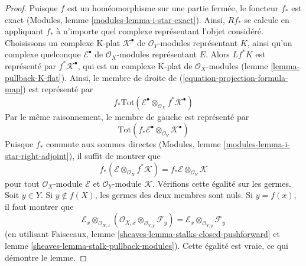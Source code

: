{\begin{proof}
Puisque $f$ est un homéomorphisme sur une partie fermée, le foncteur $f_*$
est exact (Modules, lemme \ref{modules-lemma-i-star-exact}). Ainsi,
$Rf_*$ se calcule en appliquant $f_*$ à n'importe quel complexe représentant l'objet considéré. Choisissons un complexe K-plat $\mathcal{K}^\bullet$ de $\mathcal{O}_Y$-modules représentant $K$, ainsi qu'un complexe quelconque $\mathcal{E}^\bullet$
de $\mathcal{O}_X$-modules représentant $E$. Alors
$Lf^*K$ est représenté par $f^*\mathcal{K}^\bullet$, qui est un complexe K-plat de $\mathcal{O}_X$-modules (lemme \ref{lemma-pullback-K-flat}). Ainsi, le membre de droite de (\ref{equation-projection-formula-map}) est représenté par
$$
f_*\text{Tot}(\mathcal{E}^\bullet
\otimes_{\mathcal{O}_X} f^*\mathcal{K}^\bullet)
$$
Par le même raisonnement, le membre de gauche est représenté par
$$
\text{Tot}(f_*\mathcal{E}^\bullet \otimes_{\mathcal{O}_Y} \mathcal{K}^\bullet)
$$
Puisque $f_*$ commute aux sommes directes (Modules, lemme \ref{modules-lemma-i-star-right-adjoint}), il suffit de montrer que
$$
f_*(\mathcal{E} \otimes_{\mathcal{O}_X} f^*\mathcal{K}) =
f_*\mathcal{E} \otimes_{\mathcal{O}_Y} \mathcal{K}
$$
pour tout $\mathcal{O}_X$-module $\mathcal{E}$ et $\mathcal{O}_Y$-module
$\mathcal{K}$. Vérifions cette égalité sur les germes. Soit $y \in Y$. Si $y \not \in f(X)$, les germes des deux membres sont nuls. Si $y = f(x)$, il faut montrer que
$$
\mathcal{E}_x \otimes_{\mathcal{O}_{X, x}}
(\mathcal{O}_{X, x} \otimes_{\mathcal{O}_{Y, y}} \mathcal{F}_y) =
\mathcal{E}_x \otimes_{\mathcal{O}_{Y, y}} \mathcal{F}_y
$$
(en utilisant Faisceaux, lemme \ref{sheaves-lemma-stalks-closed-pushforward}
et lemme \ref{sheaves-lemma-stalk-pullback-modules}). Cette égalité est vraie, ce qui démontre le lemme.

\end{proof}

\begin{remark}

\label{remark-compatible-with-diagram}


\end{remark}}
